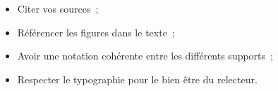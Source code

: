 \begin{itemize}
	\item Citer vos sources~;
	\item Référencer les figures dans le texte~;
	\item Avoir une notation cohérente entre les différents supports~;
	\item Respecter le typographie pour le bien être du relecteur.
\end{itemize}
